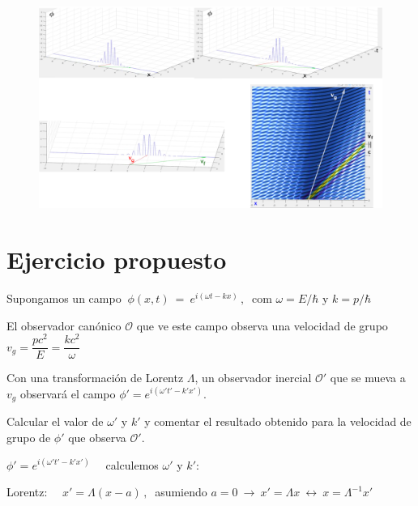\vspace{5mm}
\begin{figure}[H]
	\centering
	\includegraphics[width=.95\textwidth]{imagenes/img33-09.png}
\end{figure}






\section{Ejercicio propuesto}
\vspace{5mm}
\begin{ejercicio}
	Supongamos un campo $\ \phi(x,t) \ = \ e^{i(\omega t - kx)}\, , \ $ com $\omega=E/\hbar$ y $k=p/\hbar$
	
	El observador canónico $\mathcal O$ que ve este campo observa una velocidad de grupo $v_g=\dfrac {pc^2}{E}=\dfrac{kc^2}{\omega}$
	
	Con una transformación de Lorentz $\Lambda$, un observador inercial $\mathcal O'$ que se mueva a $v_g$ observará el campo $\phi'=e^{i(\omega' t' - k'x')}$.
	
	Calcular el valor de $\omega'$ y $k'$ y comentar el resultado obtenido para la velocidad de grupo de $\phi'$ que observa $\mathcal O'$.
\end{ejercicio}

\vspace{5mm}
\color{NavyBlue}

$\phi'=e^{i(\omega' t' - k'x')}\quad $ calculemos $\omega'$ y $k'$:

Lorentz: $\quad x'=\Lambda(x-a)\, , \ $ asumiendo $a=0 \ \to \ x'=\Lambda x \ \leftrightarrow \ x=\Lambda^{-1} x'$

